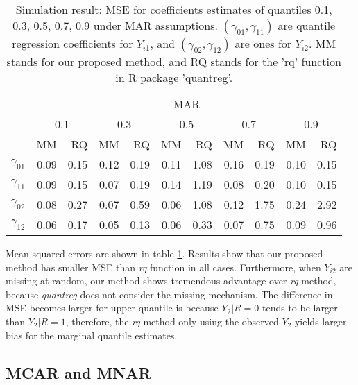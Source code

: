 \documentclass[12pt]{article}
\begin{document}
\begin{table}[ht]
  \renewcommand{\arraystretch}{1.3}
  \centering
  \caption{Simulation result: MSE for coefficients estimates of quantiles
    0.1, 0.3, 0.5, 0.7, 0.9 under MAR assumptions. $(\gamma_{01}, \gamma_{11})$ 
    are quantile regression coefficients for $Y_{i1}$, and $(\gamma_{02}, \gamma_{12})$   
  are ones for $Y_{i2}$. MM stands for our proposed method, and RQ stands for the 'rq' 
    function in R package 'quantreg'.}\label{tab:simh2}  
  \vspace{10pt}
  \begin{tabular}{rrrrrrrrrrr}
    \toprule
    & \multicolumn{ 10}{c}{MAR} \\
    \cline{2-11}
    &  \multicolumn{2}{c}{0.1} &  \multicolumn{2}{c}{0.3} &  \multicolumn{2}{c}{0.5} &
  \multicolumn{2}{c}{0.7} &  \multicolumn{2}{c}{0.9} \\
    \cline{2-11}
    & MM & RQ    & MM & RQ    & MM & RQ    & MM & RQ    & MM & RQ \\
    \hline
    $\gamma_{01}$ & 0.09 & 0.15 & 0.12 & 0.19 & 0.11 & 1.08 & 0.16 & 0.19 & 0.10 & 0.15 \\ 
    $\gamma_{11}$ & 0.09 & 0.15 & 0.07 & 0.19 & 0.14 & 1.19 & 0.08 & 0.20 & 0.10 & 0.15 \\ 
    $\gamma_{02}$ & 0.08 & 0.27 & 0.07 & 0.59 & 0.06 & 1.08 & 0.12 & 1.75 & 0.24 & 2.92 \\ 
    $\gamma_{12}$ & 0.06 & 0.17 & 0.05 & 0.13 & 0.06 & 0.33 & 0.07 & 0.75 & 0.09 & 0.96 \\ 
    \bottomrule
  \end{tabular}
\end{table}
 
Mean squared errors are shown in table \ref{tab:simh2}. Results show
that our proposed method has smaller MSE than \textit{rq} function in
all cases. Furthermore, when $Y_{i2}$ are missing at random, our
method shows tremendous advantage over \textit{rq} method, because
\textit{quantreg} does not consider the missing mechanism.  The
difference in MSE becomes larger for upper quantile is because $Y_2 |R
= 0$ tends to be larger than $Y_2 | R = 1$, therefore, the \textit{rq}
method only using the observed $Y_2$ yields larger bias for the
marginal quantile estimates.

\subsection{MCAR and MNAR}
\end{document}
